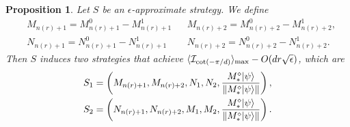 \documentclass[11pt,letterpaper]{article}
\newcommand{\ket}[1]{|#1\rangle}
\DeclarePairedDelimiter{\norm}{\lVert}{\rVert}
\DeclarePairedDelimiter{\ip}{\langle}{\rangle}
\DeclareMathOperator{\spn}{span}
\DeclareMathOperator{\supp}{supp}
\newcommand{\1}{\mathbb{1}}
\newcommand{\nr}{n(r)}
\newcommand{\I}{\mathcal{I}}
\newcommand{\ep}{\epsilon}
\newcommand{\se}{\sqrt{\epsilon}}
\newtheorem{proposition}[theorem]{Proposition}
\theoremstyle{definition}
\begin{document}


\begin{proposition}
	\label{prop:s1s2}
	Let $S$ be an $\ep$-approximate strategy. We define
	\begin{align}
		&M_{\nr+1} = M_{\nr+1}^0 - M_{\nr+1}^1 && M_{\nr+2} = M_{\nr+2}^0 - M_{\nr+2}^1,\\
		&N_{\nr+1} = N_{\nr+1}^0 - N_{\nr+1}^1 && N_{\nr+2} = N_{\nr+2}^0 - N_{\nr+2}^1.
	\end{align}
	Then $S$ induces two strategies that achieve $\ip{\I_{\cot(-\pi/d)}}_{\max} - O(d r\se)$, which are
	\begin{align}
		S_1 = \left(M_{\nr+1}, M_{\nr+2}, N_1, N_2, \frac{M_\ast^\diamond\ket{\psi}}{\norm{M_\ast^\diamond\ket{\psi}}}\right),\\
		S_2 = \left(N_{\nr+1}, N_{\nr+2}, M_1, M_2, \frac{M_\ast^\diamond\ket{\psi}}{\norm{M_\ast^\diamond\ket{\psi}}}\right).
	\end{align}
\end{proposition}
\end{document}
